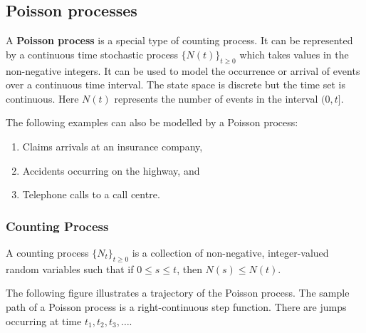 \documentclass[landscape, 20pt]{extreport}
\theoremstyle{definition}
\theoremstyle{definition}
\theoremstyle{definition}
\theoremstyle{definition}
\theoremstyle{remark}
\begin{document}
\hypertarget{poisson-processes}{%
\subsection{Poisson processes}\label{poisson-processes}}

A \textbf{Poisson process} is a special type of counting process. It can be
represented by a continuous time stochastic process \(\{N(t)\}_{t \ge 0}\)
which takes values in the non-negative integers. It can be used to model
the occurrence or arrival of events over a continuous time interval. The
state space is discrete but the time set is continuous. Here \(N(t)\)
represents the number of events in the interval \((0,t]\).

The following examples can also be modelled by a Poisson process:

\begin{enumerate}
\def\labelenumi{\arabic{enumi}.}
\item
  Claims arrivals at an insurance company,
\item
  Accidents occurring on the highway, and
\item
  Telephone calls to a call centre.
\end{enumerate}

\hypertarget{counting-process}{%
\subsubsection*{Counting Process}\label{counting-process}}

A counting process \(\{N_t \}_{t \ge 0}\) is a collection of non-negative,
integer-valued random variables such that if \(0 \le s \le t\), then
\(N(s) \le N(t)\).

The following figure illustrates a trajectory of the Poisson process.
The sample path of a Poisson process is a right-continuous step
function. There are jumps occurring at time \(t_1, t_2, t_3, \ldots\).
\end{document}
